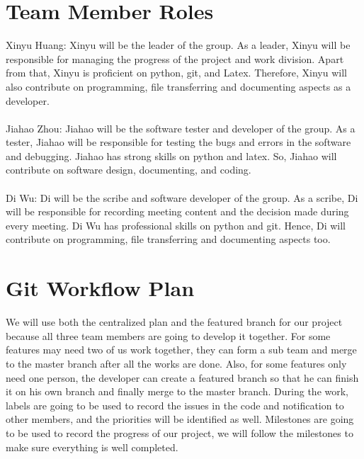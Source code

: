 \documentclass{article}
\begin{document}
\section{Team Member Roles}
Xinyu Huang: Xinyu will be the leader of the group. As a leader, Xinyu will be responsible for managing the progress of the project and work division. Apart from that, Xinyu is proficient on python, git, and Latex. Therefore, Xinyu will also contribute on programming, file transferring and documenting aspects as a developer.\\
\\
Jiahao Zhou: Jiahao will be the software tester and developer of the group. As a tester, Jiahao will be responsible for testing the bugs and errors in the software and debugging. Jiahao has strong skills on python and latex. So, Jiahao will contribute on software design, documenting, and coding.\\
\\
Di Wu: Di will be the scribe and software developer of the group. As a scribe, Di will be responsible for recording meeting content and the decision made during every meeting. Di Wu has professional skills on python and git. Hence, Di will contribute on programming, file transferring and documenting aspects too.

\section{Git Workflow Plan}
We will use both the centralized plan and the featured branch for our project because all three team members are going to develop it together. For some features may need two of us work together, they can form a sub team and merge to the master branch after all the works are done. Also, for some features only need one person, the developer can create a featured branch so that he can finish it on his own branch and finally merge to the master branch. During the work, labels are going to be used to record the issues in the code and notification to other members, and the priorities will be identified as well. Milestones are going to be used to record the progress of our project, we will follow the milestones to make sure everything is well completed.
\end{document}
